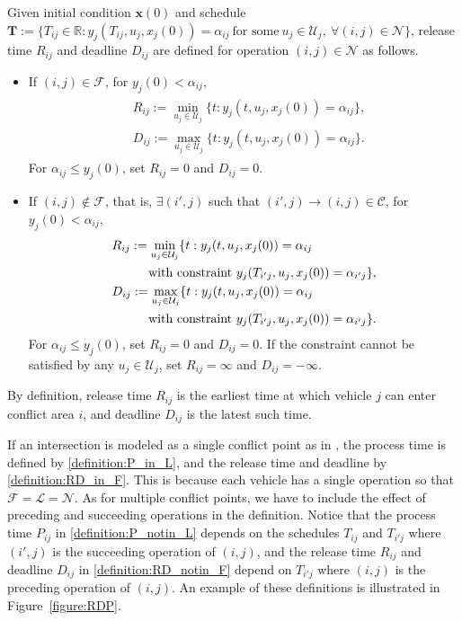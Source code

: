 \documentclass{sig-alternate}
\begin{document}
\begin{definition}
	Given initial condition $\mathbf{x}(0)$ and schedule $\mathbf{T}:=\{T_{ij}\in\mathbb{R}: y_j(T_{ij},u_j,x_j(0))=\alpha_{ij}~\text{for some}~u_j\in\mathcal{U}_j,~\forall (i,j)\in\mathcal{N}\}$, release time $R_{ij}$ and deadline $D_{ij}$ are defined for operation $(i,j)\in \mathcal{N}$ as follows.
	
	\begin{itemize}
		\item If $(i,j)\in\mathcal{F}$, for $y_{j}(0)<\alpha_{ij}$, 
		\begin{align}\label{definition:RD_in_F}
		\begin{split}
		&R_{ij}:=\min_{u_j\in\mathcal{U}_j}\{t:y_j(t,u_j,x_j(0))=\alpha_{ij}\},\\
		&D_{ij}:=\max_{u_j\in\mathcal{U}_j}\{t:y_j(t,u_j,x_j(0))=\alpha_{ij}\}.
		\end{split}
		\end{align}
		For $\alpha_{ij}\leq y_j(0)$, set $R_{ij}=0$ and $D_{ij}=0$.
		\item If $(i,j)\notin\mathcal{F}$, that is, $\exists(i',j)$ such that $(i',j)\rightarrow (i,j)\in\mathcal{C}$, for $y_j(0)<\alpha_{ij}$,
		\begin{align}\label{definition:RD_notin_F}
		\begin{split}
		&R_{ij}:=\min_{u_j\in\mathcal{U}_j}\{t:y_j(t,u_j,x_j(0))=\alpha_{ij}\\
		&\hspace{0.4in}\text{with constraint}~y_j(T_{i'j},u_j,x_j(0))=\alpha_{i'j}\},\\
		&D_{ij}:=\max_{u_j\in\mathcal{U}_j}\{t:y_j(t,u_j,x_j(0))=\alpha_{ij}\\
		&\hspace{0.4in}\text{with constraint}~y_j(T_{i'j},u_j,x_j(0))=\alpha_{i'j}\}.
		\end{split}
		\end{align}
		For $\alpha_{ij}\leq y_j(0)$, set $R_{ij}=0$ and $D_{ij}=0$. If the constraint cannot be satisfied by any $u_j\in\mathcal{U}_j$, set $R_{ij}=\infty$ and $D_{ij}=-\infty$.
	\end{itemize}	
	\end{definition}
	By definition, release time $R_{ij}$ is the earliest time at which vehicle $j$ can enter conflict area $i$, and deadline $D_{ij}$ is the latest such time. 
	

	If an intersection is modeled as a single conflict point as in \cite{colombo_efficient_2012,colombo_least_2014}, the process time is defined by \eqref{definition:P_in_L}, and the release time and deadline by \eqref{definition:RD_in_F}. This is because each vehicle has a single operation so that $\mathcal{F}=\mathcal{L}=\mathcal{N}$. As for multiple conflict points, we have to include the effect of preceding and succeeding operations in the definition. Notice that the process time $P_{ij}$ in \eqref{definition:P_notin_L} depends on the schedules $T_{ij}$ and $T_{i'j}$ where $(i',j)$ is the succeeding operation of $(i,j)$, and the release time $R_{ij}$ and deadline $D_{ij}$ in \eqref{definition:RD_notin_F} depend on $T_{i'j}$ where $(i,j)$ is the preceding operation of $(i,j)$. An example of these definitions is illustrated in Figure~\ref{figure:RDP}.
	
\end{document}
